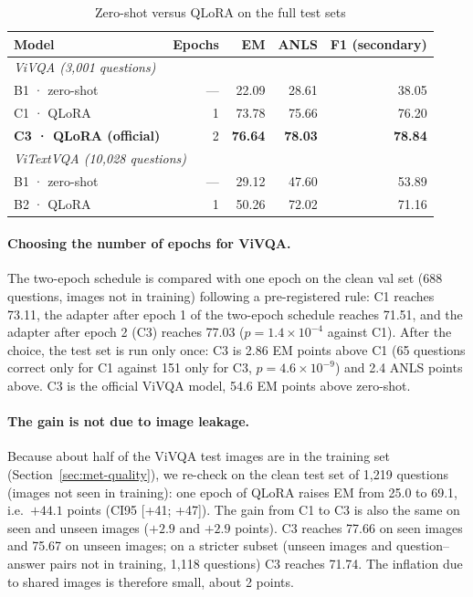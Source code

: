 \begin{table}[htbp]
\caption{Zero-shot versus QLoRA on the full test sets}
\label{tab:res-qlora}
\centering
\small
\begin{tabular}{p{}rrrr}
\toprule
\textbf{Model} & \textbf{Epochs} & \textbf{EM} & \textbf{ANLS} & \textbf{F1 (secondary)} \\
\midrule
\multicolumn{5}{l}{\textit{ViVQA (3,001 questions)}} \\
B1 · zero-shot & --- & 22.09 & 28.61 & 38.05 \\
C1 · QLoRA & 1 & 73.78 & 75.66 & 76.20 \\
\textbf{C3 · QLoRA (official)} & 2 & \textbf{76.64} & \textbf{78.03} & \textbf{78.84} \\
\midrule
\multicolumn{5}{l}{\textit{ViTextVQA (10,028 questions)}} \\
B1 · zero-shot & --- & 29.12 & 47.60 & 53.89 \\
B2 · QLoRA & 1 & 50.26 & 72.02 & 71.16 \\
\bottomrule
\end{tabular}
\end{table}

\paragraph{Choosing the number of epochs for ViVQA.} The two-epoch schedule is compared with
one epoch on the clean val set (688 questions, images not in training) following a
pre-registered rule: C1 reaches 73.11, the adapter after epoch 1 of the two-epoch schedule
reaches 71.51, and the adapter after epoch 2 (C3) reaches 77.03 ($p = 1.4\times10^{-4}$
against C1). After the choice, the test set is run only once: C3 is 2.86 EM points above C1
(65 questions correct only for C1 against 151 only for C3, $p = 4.6\times10^{-9}$) and 2.4
ANLS points above. C3 is the official ViVQA model, 54.6 EM points above zero-shot.

\paragraph{The gain is not due to image leakage.} Because about half of the ViVQA test images
are in the training set (Section~\ref{sec:met-quality}), we re-check on the clean
test set of 1,219 questions (images not seen in training): one epoch of QLoRA raises EM from
25.0 to 69.1, i.e.\ $+44.1$ points (CI95 [+41; +47]). The gain from C1 to C3 is also the
same on seen and unseen images ($+2.9$ and $+2.9$ points). C3 reaches 77.66 on seen images
and 75.67 on unseen images; on a stricter subset (unseen images and question--answer pairs
not in training, 1,118 questions) C3 reaches 71.74. The inflation due to shared images is
therefore small, about 2 points.


